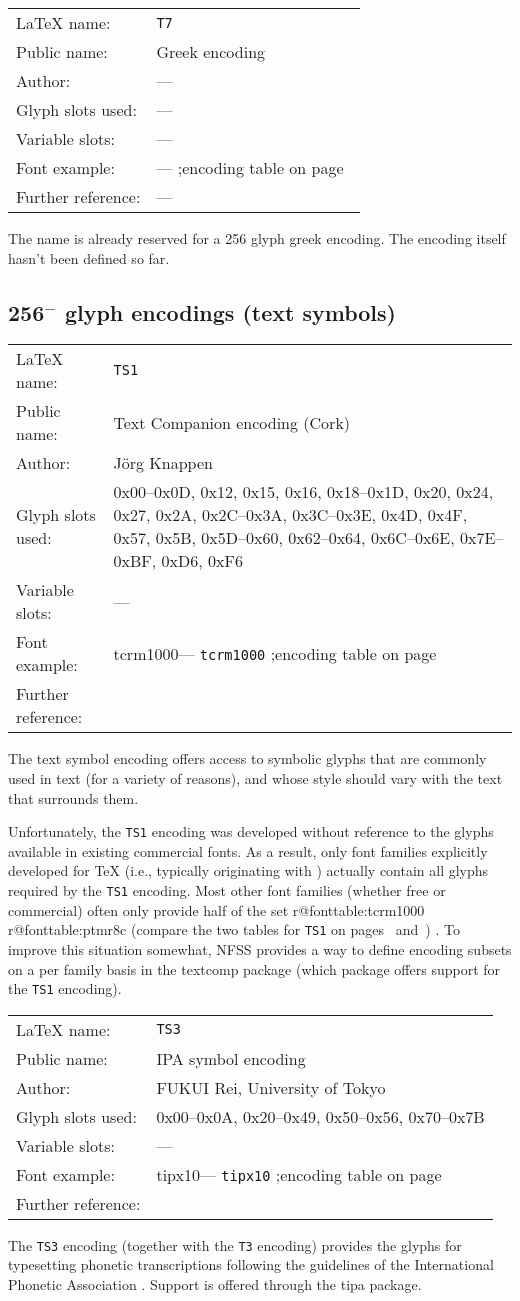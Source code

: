 \documentclass{ltxguide}[1994/11/20]
\makeatletter
\providecommand{\Enc}[1]{\texttt{#1}}
\providecommand{\Pkg}[1]{%
  \textsf{#1}}
\newenvironment{encodinginfo}[7]%
  {\noindent
   \begin{tabularx}{\linewidth}{@{}l>{\raggedright\let\\\tabularnewline}X}%
     \LaTeX{} name:          & \texttt{#1}\\%
     Public name:          & #2\\%
     Author:                   & #3\\%
     Glyph slots used: & #4\\%
     Variable slots:     & #5\\%
     Font example:     & \def\@tempa{#6}\ifx\@tempa\@empty---%
                            \else\texttt{#6}\referenceftable{#6}\fi\\%
     Further reference:                & #7%
   \end{tabularx}%
   \par\nobreak
   \vspace*{3pt}%
   \quote
  }%
  {\endquote
   \vspace{6pt}}
\def\referenceftable#1{
  \@ifundefined{r@fonttable:#1}%
  \relax
  {;\space encoding table on page~\pageref{fonttable:#1}}%
}
\makeatother
\begin{document}
\begin{encodinginfo}{T7}
        {Greek encoding}
   {---}
   {---}
   {---}
   {}
   {---}

The name is already reserved for a 256 glyph greek encoding. The encoding
itself hasn't been defined so far.

\end{encodinginfo}



\subsection{256$^-$ glyph encodings (text symbols)}

\begin{encodinginfo}{TS1}
        {Text Companion encoding (Cork)}
        {J\"org Knappen}
  {0x00--0x0D, 0x12, 0x15, 0x16, 0x18--0x1D, 0x20, 0x24, 0x27, 0x2A,
   0x2C--0x3A, 0x3C--0x3E, 0x4D, 0x4F, 0x57, 0x5B, 0x5D--0x60,
   0x62--0x64, 0x6C--0x6E, 0x7E--0xBF, 0xD6, 0xF6}
  {---}
        {tcrm1000}
        {\cite{Knappen:TB17-2-96}}

   The text symbol encoding offers access to symbolic glyphs that are
  commonly used in text (for a variety of reasons), and whose style
  should vary with the text that surrounds them.

  Unfortunately, the \Enc{TS1} encoding was developed without
  reference to the glyphs available in existing commercial fonts.
  As a result, only font families
  explicitly developed for \TeX{} (i.e., typically originating with
  \MF{}) actually contain all glyphs required by the \Enc{TS1}
  encoding.  Most other font families (whether free or commercial)
  often only provide half of the set%
\expandafter\ifx\csname r@fonttable:tcrm1000\endcsname\relax
\else
  \expandafter\ifx\csname r@fonttable:ptmr8c\endcsname\relax
  \else
    \space (compare the two tables for \Enc{TS1} on
     pages~\pageref{fonttable:tcrm1000}
     and~\pageref{fonttable:ptmr8c})%
  \fi
\fi.
  To improve this situation somewhat, NFSS provides a way to define encoding
  subsets on a per family basis in the \Pkg{textcomp} package (which
  package offers support for the \Enc{TS1} encoding).
\end{encodinginfo}


\begin{encodinginfo}{TS3}
        {IPA symbol encoding}
        {FUKUI Rei, University of Tokyo}
        {0x00--0x0A, 0x20--0x49, 0x50--0x56, 0x70--0x7B}
        {---}
        {tipx10}
        {\cite{Rei:TB17-2-102}}

  The \Enc{TS3} encoding (together with the \Enc{T3} encoding) provides the
  glyphs for typesetting phonetic transcriptions following the
  guidelines of the International Phonetic Association \cite{ipa}.  Support
  is offered through the \Pkg{tipa} package.
\end{encodinginfo}
\end{document}
